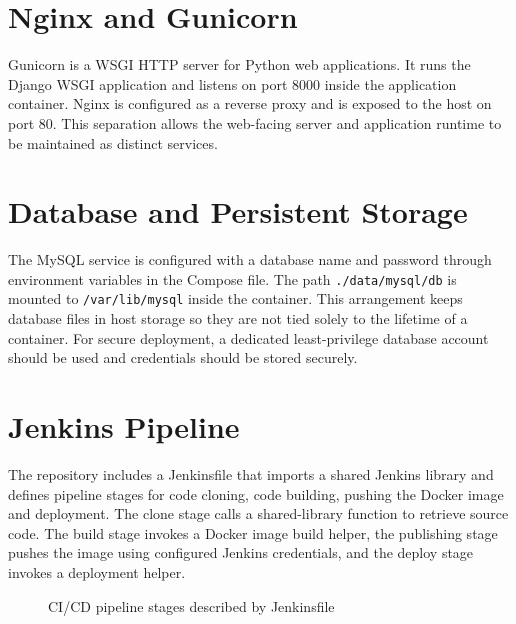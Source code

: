 \documentclass[12pt,a4paper,oneside]{report}
\begin{document}
\section{Nginx and Gunicorn}
Gunicorn is a WSGI HTTP server for Python web applications. It runs the Django WSGI application and listens on port 8000 inside the application container. Nginx is configured as a reverse proxy and is exposed to the host on port 80. This separation allows the web-facing server and application runtime to be maintained as distinct services.

\section{Database and Persistent Storage}
The MySQL service is configured with a database name and password through environment variables in the Compose file. The path \texttt{./data/mysql/db} is mounted to \texttt{/var/lib/mysql} inside the container. This arrangement keeps database files in host storage so they are not tied solely to the lifetime of a container. For secure deployment, a dedicated least-privilege database account should be used and credentials should be stored securely.

\section{Jenkins Pipeline}
The repository includes a Jenkinsfile that imports a shared Jenkins library and defines pipeline stages for code cloning, code building, pushing the Docker image and deployment. The clone stage calls a shared-library function to retrieve source code. The build stage invokes a Docker image build helper, the publishing stage pushes the image using configured Jenkins credentials, and the deploy stage invokes a deployment helper.

\begin{figure}[H]
\centering
{}
\caption{CI/CD pipeline stages described by Jenkinsfile}
\label{fig:jenkins}
\end{figure}
\end{document}

